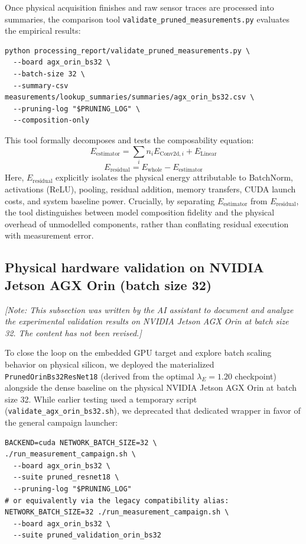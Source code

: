 Once physical acquisition finishes and raw sensor traces are processed into summaries, the comparison tool \texttt{validate\_}\allowbreak\texttt{pruned\_}\allowbreak\texttt{measurements.py} evaluates the empirical results:
\begin{lstlisting}
python processing_report/validate_pruned_measurements.py \
  --board agx_orin_bs32 \
  --batch-size 32 \
  --summary-csv measurements/lookup_summaries/summaries/agx_orin_bs32.csv \
  --pruning-log "$PRUNING_LOG" \
  --composition-only
\end{lstlisting}
This tool formally decomposes and tests the composability equation:
\begin{equation}
    E_{\text{estimator}} = \sum_i n_i E_{\text{Conv2d}, i} + E_{\text{Linear}}
\end{equation}
\begin{equation}
    E_{\text{residual}} = E_{\text{whole}} - E_{\text{estimator}}
\end{equation}
Here, $E_{\text{residual}}$ explicitly isolates the physical energy attributable to BatchNorm, activations (ReLU), pooling, residual addition, memory transfers, CUDA launch costs, and system baseline power. Crucially, by separating $E_{\text{estimator}}$ from $E_{\text{residual}}$, the tool distinguishes between model composition fidelity and the physical overhead of unmodelled components, rather than conflating residual execution with measurement error.

\subsection{Physical hardware validation on NVIDIA Jetson AGX Orin (batch size 32)}
\label{sec:bridge_agxorin_bs32_validation}

\noindent\textit{[Note: This subsection was written by the AI assistant to document and analyze the experimental validation results on NVIDIA Jetson AGX Orin at batch size 32. The content has not been revised.]}
\vspace{0.5em}

To close the loop on the embedded GPU target and explore batch scaling behavior on physical silicon, we deployed the materialized \texttt{PrunedOrinBs32ResNet18} (derived from the optimal $\lambda_E = 1.20$ checkpoint) alongside the dense baseline on the physical NVIDIA Jetson AGX Orin at batch size 32. While earlier testing used a temporary script (\texttt{validate\_agx\_orin\_bs32.sh}), we deprecated that dedicated wrapper in favor of the general campaign launcher:
\begin{lstlisting}
BACKEND=cuda NETWORK_BATCH_SIZE=32 \
./run_measurement_campaign.sh \
  --board agx_orin_bs32 \
  --suite pruned_resnet18 \
  --pruning-log "$PRUNING_LOG"
# or equivalently via the legacy compatibility alias:
NETWORK_BATCH_SIZE=32 ./run_measurement_campaign.sh \
  --board agx_orin_bs32 \
  --suite pruned_validation_orin_bs32
\end{lstlisting}

